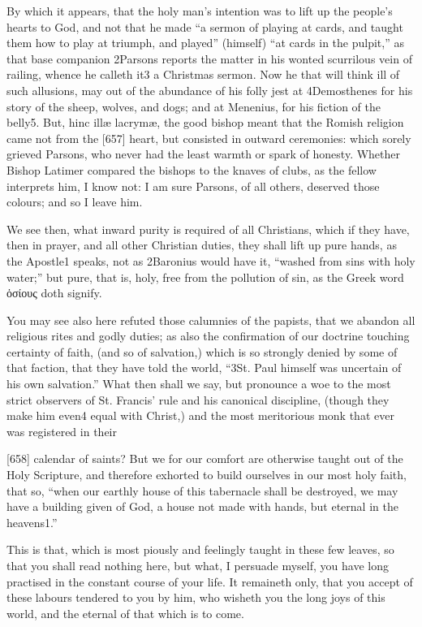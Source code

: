 By which it appears, that the holy man’s intention was to lift up the people’s hearts to God, and not that he made “a sermon of playing at cards, and taught them how to play at triumph, and played” (himself) “at cards in the pulpit,” as that base companion 2Parsons reports the matter in his wonted scurrilous vein of railing, whence he calleth it3 a Christmas sermon. Now he that will think ill of such allusions, may out of the abundance of his folly jest at 4Demosthenes for his story of the sheep, wolves, and dogs; and at Menenius, for his fiction of the belly5. But, hinc illæ lacrymæ, the good bishop meant that the Romish religion came not from the [657] heart, but consisted in outward ceremonies: which sorely grieved Parsons, who never had the least warmth or spark of honesty. Whether Bishop Latimer compared the bishops to the knaves of clubs, as the fellow interprets him, I know not: I am sure Parsons, of all others, deserved those colours; and so I leave him.

We see then, what inward purity is required of all Christians, which if they have, then in prayer, and all other Christian duties, they shall lift up pure hands, as the Apostle1 speaks, not as 2Baronius would have it, “washed from sins with holy water;” but pure, that is, holy, free from the pollution of sin, as the Greek word ὁσίους doth signify.

You may see also here refuted those calumnies of the papists, that we abandon all religious rites and godly duties; as also the confirmation of our doctrine touching certainty of faith, (and so of salvation,) which is so strongly denied by some of that faction, that they have told the world, “3St. Paul himself was uncertain of his own salvation.” What then shall we say, but pronounce a woe to the most strict observers of St. Francis’ rule and his canonical discipline, (though they make him even4 equal with Christ,) and the most meritorious monk that ever was registered in their

[658]
calendar of saints? But we for our comfort are otherwise taught out of the Holy Scripture, and therefore exhorted to build ourselves in our most holy faith, that so, “when our earthly house of this tabernacle shall be destroyed, we may have a building given of God, a house not made with hands, but eternal in the heavens1.”

This is that, which is most piously and feelingly taught in these few leaves, so that you shall read nothing here, but what, I persuade myself, you have long practised in the constant course of your life. It remaineth only, that you accept of these labours tendered to you by him, who wisheth you the long joys of this world, and the eternal of that which is to come.

